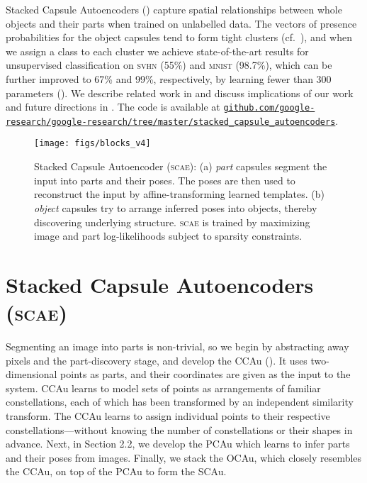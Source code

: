 \documentclass{article}
\begin{document}
Stacked Capsule Autoencoders () capture spatial relationships between whole objects and their parts when trained on unlabelled data.
The vectors of presence probabilities for the object capsules tend to form tight clusters (cf.\ ), and when we assign a class to each cluster we achieve state-of-the-art results for unsupervised classification on \textsc{svhn} (55\%) and \textsc{mnist} (98.7\%), which can be further improved to 67\% and 99\%, respectively, by learning fewer than 300 parameters 
().
We describe related work in  and discuss implications of our work and future directions in .
The code is available at {\small \href{https://github.com/google-research/google-research/tree/master/stacked_capsule_autoencoders}{\texttt{github.com/google-research/google-research/tree/master/stacked\_capsule\_autoencoders}}}.

\begin{figure}
    \centering
    \begin{minipage}[c]{0.68\linewidth}
        \centering
        \texttt{[image: figs/blocks\_v4]}
    \end{minipage}
    \hfill
    \begin{minipage}[c]{0.3\linewidth}
        \centering
        \caption{
            Stacked Capsule Autoencoder (\textsc{scae}):
            (a) \textit{part} capsules segment the input into parts and their poses. The poses are then used to reconstruct the input by affine-transforming learned templates.
            (b) \textit{object} capsules try to arrange inferred poses into objects, thereby discovering underlying structure.
            \textsc{scae} is trained by maximizing image and part log-likelihoods subject to sparsity constraints.
        }
        \label{fig:capsule_arch}
    \end{minipage}
\end{figure} \section{Stacked Capsule Autoencoders (\textsc{scae})}
\label{sec:caps_decoders}

Segmenting an image into parts is non-trivial, so we begin by abstracting away pixels and the part-discovery stage, and develop the \gls{CCAu} ().
It uses two-dimensional points as parts, and their coordinates are given as the input to the system. \Gls{CCAu} learns to model sets of points as arrangements of familiar constellations, each of which has been transformed by an independent similarity transform. The \gls{CCAu} learns to assign individual points to their respective constellations—without knowing the number of constellations or their shapes in advance.  Next, in Section 2.2, we develop the \gls{PCAu} which learns to infer parts and their poses from images. Finally, we stack the \gls{OCAu}, which closely resembles the \gls{CCAu}, on top of the \gls{PCAu} to form the \gls{SCAu}.
\end{document}

